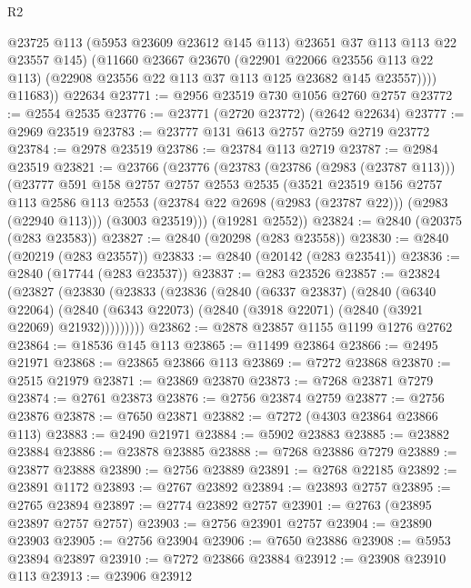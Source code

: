 \begin{lexlean}{R2}
\begin{coremodule}
              @23725
              @113
              (@5953 @23609 @23612 @145 @113)
              @23651
              @37
              @113
              @113
              @22
              @23557
              @145)
            (@11660
              @23667
              @23670
              (@22901 @22066 @23556 @113 @22 @113)
              (@22908 @23556 @22 @113 @37 @113 @125 @23682 @145 @23557))))
        @11683))
    @22634
@23771 := @2956 @23519 @730 @1056 @2760 @2757
@23772 := @2554 @2535
@23776 := @23771 (@2720 @23772) (@2642 @22634)
@23777 := @2969 @23519
@23783 := @23777 @131 @613 @2757 @2759 @2719 @23772
@23784 := @2978 @23519
@23786 := @23784 @113 @2719
@23787 := @2984 @23519
@23821 := @23766
    (@23776
      (@23783
        (@23786 (@2983 (@23787 @113)))
        (@23777
          @591
          @158
          @2757
          @2757
          @2553
          @2535
          (@3521
            @23519
            @156
            @2757
            @113
            @2586
            @113
            @2553
            (@23784 @22 @2698 (@2983 (@23787 @22)))
            (@2983 (@22940 @113)))
          (@3003 @23519)))
      (@19281 @2552))
@23824 := @2840 (@20375 (@283 @23583))
@23827 := @2840 (@20298 (@283 @23558))
@23830 := @2840 (@20219 (@283 @23557))
@23833 := @2840 (@20142 (@283 @23541))
@23836 := @2840 (@17744 (@283 @23537))
@23837 := @283 @23526
@23857 := @23824
    (@23827
      (@23830
        (@23833
          (@23836
            (@2840
              (@6337 @23837)
              (@2840
                (@6340 @22064)
                (@2840 (@6343 @22073) (@2840 (@3918 @22071) (@2840 (@3921 @22069) @21932)))))))))
@23862 := @2878 @23857 @1155 @1199 @1276 @2762
@23864 := @18536 @145 @113
@23865 := @11499 @23864
@23866 := @2495 @21971
@23868 := @23865 @23866 @113
@23869 := @7272 @23868
@23870 := @2515 @21979
@23871 := @23869 @23870
@23873 := @7268 @23871 @7279
@23874 := @2761 @23873
@23876 := @2756 @23874 @2759
@23877 := @2756 @23876
@23878 := @7650 @23871
@23882 := @7272 (@4303 @23864 @23866 @113)
@23883 := @2490 @21971
@23884 := @5902 @23883
@23885 := @23882 @23884
@23886 := @23878 @23885
@23888 := @7268 @23886 @7279
@23889 := @23877 @23888
@23890 := @2756 @23889
@23891 := @2768 @22185
@23892 := @23891 @1172
@23893 := @2767 @23892
@23894 := @23893 @2757
@23895 := @2765 @23894
@23897 := @2774 @23892 @2757
@23901 := @2763 (@23895 @23897 @2757 @2757)
@23903 := @2756 @23901 @2757
@23904 := @23890 @23903
@23905 := @2756 @23904
@23906 := @7650 @23886
@23908 := @5953 @23894 @23897
@23910 := @7272 @23866 @23884
@23912 := @23908 @23910 @113
@23913 := @23906 @23912

\end{coremodule}
\end{lexlean}
